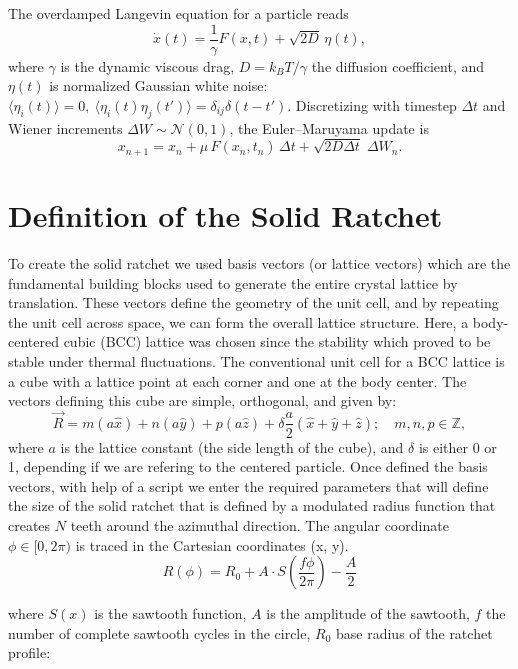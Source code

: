 The overdamped Langevin equation for a particle reads
\[
  \dot{x}(t)= \frac{1}{\gamma} F(x,t)+\sqrt{2D}\,\eta(t),
\]
where $\gamma$ is the dynamic viscous drag, \(D=k_BT/\gamma\) the diffusion coefficient,
and \(\eta(t)\) is normalized Gaussian white noise:
\(\langle\eta_i(t)\rangle=0,\ \langle\eta_i(t)\eta_j(t')\rangle=\delta_{ij}\delta(t-t')\).
Discretizing with timestep \(\Delta t\) and Wiener increments \(\Delta W\sim\mathcal N(0, 1)\),
the Euler--Maruyama update is
\begin{equation}
x_{n+1} =  x_n + \mu\, F( x_n,t_n)\,\Delta t
  + \sqrt{2D \Delta t}\;\Delta W_n.
\label{eq:em_overdamped}
\end{equation}
\section{Definition of the Solid Ratchet}

To create the solid ratchet we used basis vectors (or lattice vectors) which are the fundamental building blocks used to generate the entire crystal lattice by translation. These vectors define the geometry of the unit cell, and by repeating the unit cell across space, we can form the overall lattice structure. Here, a body-centered cubic (BCC) lattice was chosen since the stability which proved to be stable under thermal fluctuations.
The conventional unit cell for a BCC lattice is a cube with a lattice point at each corner and one at the body center. The vectors defining this cube are simple, orthogonal, and given by:
%
\begin{equation}
  \vec{R} = m(a\hat{x}) + n(a\hat{y}) + p(a\hat{z}) + \delta \frac{a}{2}(\hat{x} + \hat{y} + \hat{z}); \quad m,n,p \in \mathbb{Z},
\end{equation}
%
where \( a \) is the lattice constant (the side length of the cube), and $\delta$ is either 0 or 1, depending if we are refering to the centered particle. Once defined the basis vectors, with help of a script we enter the required parameters that will define the size of the solid ratchet that is defined by a modulated radius function that creates $N$ teeth around the azimuthal direction. The angular coordinate $\phi \in [0, 2\pi)$ is traced in the Cartesian coordinates (x, y).
\begin{equation}
R(\phi) = R_0 + A \cdot S\left(\frac{f\phi}{2\pi}\right) - \frac{A}{2}
\end{equation}

where $S(x)$ is the sawtooth function, $A$ is the amplitude of the sawtooth, $f$ the number of complete sawtooth cycles in the circle, $R_0$ base radius of the ratchet profile:

